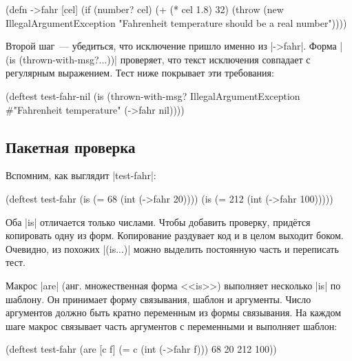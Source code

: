 \begin{english}
  \begin{clojure}
(defn ->fahr [cel]
  (if (number? cel)
    (+ (* cel 1.8) 32)
    (throw (new IllegalArgumentException
            "Fahrenheit temperature should be a real number"))))
  \end{clojure}
\end{english}

Второй шаг~--- убедиться, что исключение пришло именно из \spverb|->fahr|. Форма
\spverb|(is (thrown-with-msg?...))| проверяет, что текст исключения совпадает с
регулярным выражением. Тест ниже покрывает эти требования:

\begin{english}
  \begin{clojure}
(deftest test-fahr-nil
  (is (thrown-with-msg?
       IllegalArgumentException #"Fahrenheit temperature"
       (->fahr nil))))
  \end{clojure}
\end{english}

\subsection{Пакетная проверка}

Вспомним, как выглядит \spverb|test-fahr|:

\begin{english}
  \begin{clojure}
(deftest test-fahr
  (is (= 68 (int (->fahr 20))))
  (is (= 212 (int (->fahr 100)))))
  \end{clojure}
\end{english}

Оба \spverb|is| отличается только числами. Чтобы добавить проверку, прид\"{е}тся
копировать одну из форм. Копирование раздувает код и в целом выходит
боком. Очевидно, из похожих \spverb|(is...)| можно выделить постоянную часть и
переписать тест.


Макрос \spverb|are| (анг. множественная форма <<is>>) выполняет несколько
\spverb|is| по шаблону. Он принимает форму связывания, шаблон и аргументы. Число
аргументов должно быть кратно переменным из формы связывания. На каждом шаге
макрос связывает часть аргументов с переменными и выполняет шаблон:

\begin{english}
  \begin{clojure}
(deftest test-fahr
  (are [c f] (= c (int (->fahr f)))
    68 20
    212 100))
  \end{clojure}
\end{english}

